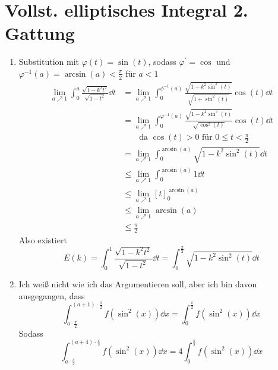\documentclass[sectionformat=aufgabe]{gadsescript}
\begin{document}
\section{Vollst. elliptisches Integral 2. Gattung}
\begin{enumerate}[label=(\alph*)]
	\item 
		Substitution mit $ \varphi(t) = \sin (t) $, sodass $ \varphi^\prime  = \cos  $ und $ \varphi^{-1} (a) = \arcsin (a) < \frac{ \pi }{ 2 } $ für $ a < 1 $
		\begin{align*}
			\lim_{a \nearrow 1} \int_{0}^{a} \frac{ \sqrt{1 - k^2t^2} }{ \sqrt{1 - t^2} } \dd t &= \lim_{a \nearrow 1} \int_{0}^{\phi^{-1} (a) } \frac{ \sqrt{1 - k^2 \sin ^2(t)} }{ \sqrt{1 + \sin ^2 (t)}  } \cos (t) \dd t \\
			&= \lim_{a \nearrow 1} \int_{0}^{\varphi^{-1} (a)} \frac{ \sqrt{1 - k^2 \sin ^2(t) } }{ \sqrt{\cos ^2(t)}  }  \cos (t) \dd t \\
			& \qquad\text{da } \cos (t) > 0 \text{ für } 0 \leq t < \frac{ \pi }{ 2 } \\
			&= \lim_{a \nearrow 1} \int_{0}^{\arcsin (a)} \sqrt{1 - k^2 \sin ^2(t) } \dd t\\
			&\leq  \lim_{a \nearrow 1} \int_{0}^{\arcsin (a)} 1 \dd t\\
			&\leq \lim_{a \nearrow 1} [t]_{0} ^{\arcsin (a)} \\
			&\leq \lim_{a \nearrow 1} \arcsin (a) \\
			&\leq \frac{ \pi }{ 2 } 
		\end{align*}
		Also existiert
		\[
			E(k) = \int_{0}^{1} \frac{ \sqrt{1 - k^2t^2} }{ \sqrt{1 - t^2}  } \dd t = \int_{0}^{\frac{ \pi }{ 2 } } \sqrt{1 - k^2 \sin ^2(t)} \dd t
		\]
		
	\item 
		Ich weiß nicht wie ich das Argumentieren soll, aber ich bin davon ausgegangen, dass
		\[
			\int_{a \cdot \frac{ \pi }{ 2 } }^{(a + 1) \cdot \frac{ \pi }{ 2 } } f(\sin ^2(x)) \dd x = \int_{0}^{\frac{ \pi }{ 2 } } f(\sin ^2(x)) \dd x
		\]
		Sodass 
		\begin{equation}
			\label{eq:A3 b) 1}
			\int_{a\cdot \frac{\pi }{ 2 } }^{ (a + 4) \cdot \frac{ \pi }{ 2 }  } f( \sin ^2(x) ) \dd x = 4 \int_{0}^{\frac{ \pi }{ 2 } } f( \sin ^2(x)) \dd x
		\end{equation}
		

\end{enumerate}
\end{document}
